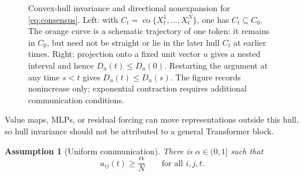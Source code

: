 \documentclass[11pt]{amsart}
\numberwithin{equation}{section}
\theoremstyle{plain}
\newtheorem{assumption}[theorem]{Assumption}
\begin{document}
\begin{figure}[htbp]
\caption{Convex-hull invariance and directional nonexpansion for
\eqref{eq:consensus}.  Left: with
$C_t=\operatorname{co}\{X_t^1,\ldots,X_t^N\}$, one has
$C_t\subseteq C_0$.  The orange curve is a schematic trajectory of one token:
it remains in $C_0$, but need not be straight or lie in the later hull $C_t$
at earlier times.  Right: projection onto a fixed unit vector $u$ gives a
nested interval and hence $D_u(t)\leq D_u(0)$.  Restarting the argument at any
time $s<t$ gives $D_u(t)\leq D_u(s)$.  The figure records nonincrease only;
exponential contraction requires additional communication
conditions.}
\label{fig:consensus-hull-diameter}
\end{figure}

Value maps, MLPs, or residual forcing can move representations outside
this hull, so hull invariance should not be attributed to a general
Transformer block.



\begin{assumption}[Uniform communication]\label{ass:uniform-mixing}
There is $\alpha\in(0,1]$ such that
\[
  a_{ij}(t)\geq\frac{\alpha}{N}
  \qquad\text{for all }i,j,t.
\]
\end{assumption}
\end{document}
